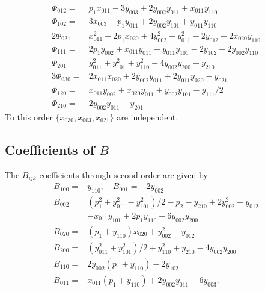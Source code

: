 \documentclass[aip,pop,reprint]{revtex4-1}
\begin{document}
\begin{appendices}
\begin{align}
\Phi_{012} = & p_1 x_{011} - 3 y_{003} + 2 y_{002} y_{011} + x_{011} y_{110} \nonumber\\
\Phi_{102} = & 3 x_{003} + p_1 y_{011} + 2 y_{002} y_{101} + y_{011} y_{110}\\
2\Phi_{021} = & x_{011}^2 + 2 p_1 x_{020} + 4 y_{002}^2 + y_{011}^2 - 2 y_{012} + 2 x_{020}y_{110} \nonumber\\
\Phi_{111}= & 2 p_1 y_{002} + x_{011} y_{011} + y_{011} y_{101} - 2 y_{102} + 2 y_{002} y_{110}\nonumber\\
\Phi_{201} = & y_{011}^2 + y_{101}^2 + y_{110}^2 - 4 y_{002} y_{200} + y_{210} \nonumber\\
3 \Phi_{030} = & 2 x_{011} x_{020} + 2 y_{002} y_{011} + 2 y_{011} y_{020}- y_{021} \nonumber\\
\Phi_{120} = & x_{011} y_{002} +  x_{020} y_{011} +  y_{002} y_{101} - y_{111}/2 \nonumber\\
\Phi_{210}= & 2 y_{002} y_{011} - y_{201} \nonumber
\end{align}
To this order $\{x_{030},x_{003},x_{021}\}$ are independent. 

\subsection*{Coefficients of $B$}

The $B_{ijk}$ coefficients through second order are given by
\begin{align}
B_{100}= &y_{110}, \quad B_{001}= -2 y_{002} \nonumber\\
B_{002}= &(p^2_1 +y_{011}^2- y_{101}^2)/2 -p_2-y_{210}+2 y_{002}^2 +y_{012}\nonumber \\
& -x_{011}y_{101} +2p_1 y_{110}+6 y_{002} y_{200} \nonumber\\
B_{020}= & (p_1+y_{110})x_{020}+y_{002}^2 -y_{012}\\
B_{200}=& (y_{011}^2 +y_{101}^2)/2 +y_{110}^2+y_{210}-4y_{002}y_{200} \nonumber\\
B_{110}=& 2y_{002}(p_1+y_{110}) -2y_{102} \nonumber\\
B_{011}=& x_{011}(p_1+y_{110}) +2y_{002}y_{011} - 6 y_{003}. \nonumber
\end{align}


\end{appendices}
\end{document}

